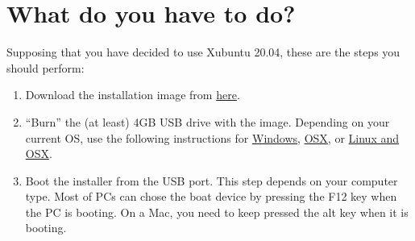 \section{What do you have to do?}

Supposing that you have decided to use Xubuntu 20.04, these are the steps
you should perform:

\begin{enumerate}
  \item Download the installation image from
    \href{https://xubuntu.org/download/}{here}.
    
  \item ``Burn'' the (at least) 4GB USB drive with the
    image. Depending on your current OS, use the following
    instructions for
    \href{https://ubuntu.com/tutorials/create-a-usb-stick-on-windows#1-overview}{Windows},
    \href{https://ubuntu.com/tutorials/create-a-usb-stick-on-macos#1-overview}{OSX},
    or
    \href{https://askubuntu.com/questions/372607/how-to-create-a-bootable-ubuntu-usb-flash-drive-from-terminal}{Linux and OSX}.

\item Boot the installer from the USB port. This step depends on your
  computer type. Most of PCs can chose the boat device by pressing the
  F12 key when the PC is booting. On a Mac, you need to keep pressed
  the alt key when it is booting.
  

\end{enumerate}
